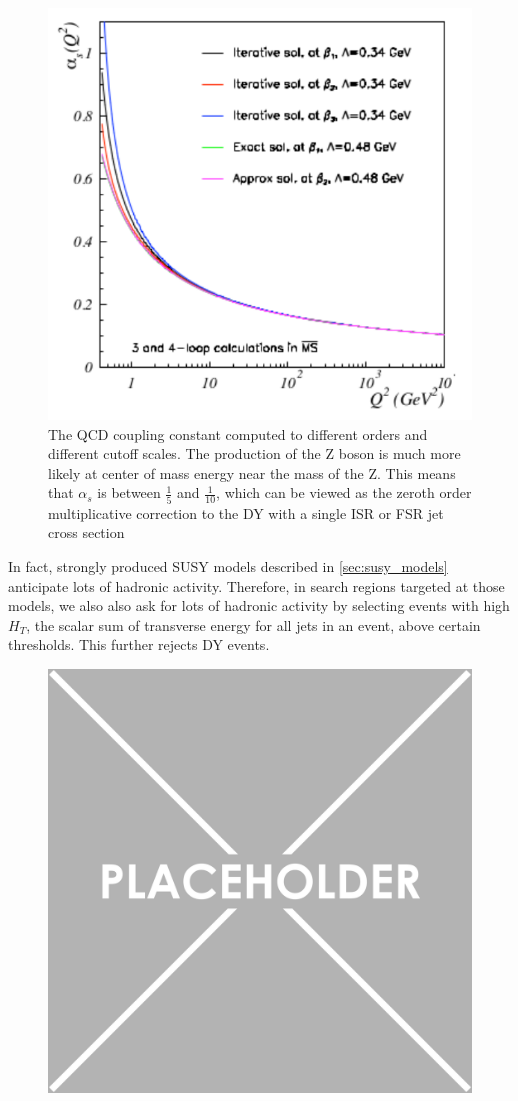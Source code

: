       \begin{figure}[h!]
        \centering
        \includegraphics[width=.5\textwidth]{figures/QCD_Coupling_Running.pdf}
        \caption{The QCD coupling constant computed to different orders and different cutoff scales. The production of the Z boson is much more likely at center of mass energy near the mass of the Z. This means that $\alpha_s$ is between $\frac{1}{5}$ and $\frac{1}{10}$, which can be viewed as the zeroth order multiplicative correction to the DY with a single ISR or FSR jet cross section} 
        \label{fig:alpha_s_running}
      \end{figure}

      In fact, strongly produced SUSY models described in \ref{sec:susy_models} anticipate lots of hadronic activity. Therefore, in search regions targeted at those models, we also also ask for lots of hadronic activity by selecting events with high $H_T$, the scalar sum of transverse energy for all jets in an event, above certain thresholds. This further rejects DY events.

      \begin{figure}[h!]
        \centering
        \includegraphics[width=.5\textwidth]{figures/placeholder.png}
        \caption{}
        \label{fig:DY-diagram}
      \end{figure}

